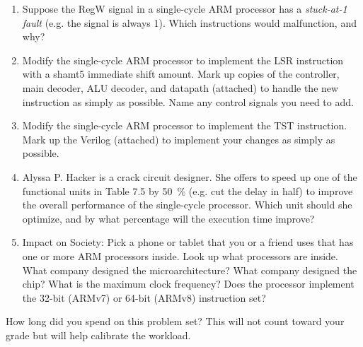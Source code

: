 \documentclass{e85}
\date{2019}
\author{}
\begin{document}
\begin{enumerate}
\item Suppose the RegW signal in a single-cycle ARM processor has a
  \emph{stuck-at-1 fault} (e.g. the signal is always 1).  Which
  instructions would malfunction, and why?

  \begin{solution}
  \end{solution}

\item Modify the single-cycle ARM processor to implement the LSR
  instruction with a shamt5 immediate shift amount.  Mark up copies of
  the controller, main decoder, ALU decoder, and datapath (attached)
  to handle the new instruction as simply as possible.  Name any
  control signals you need to add.

  \begin{solution}
  \end{solution}

\item Modify the single-cycle ARM processor to implement the TST
  instruction.  Mark up the Verilog (attached) to implement your
  changes as simply as possible.

  \begin{solution}
  \end{solution}

\item Alyssa P. Hacker is a crack circuit designer.  She offers to
  speed up one of the functional units in Table 7.5 by
  \SI{50}{\percent} (e.g. cut the delay in half) to improve the
  overall performance of the single-cycle processor.  Which unit
  should she optimize, and by what percentage will the execution time
  improve?

  \begin{solution}
  \end{solution}

\item Impact on Society: Pick a phone or tablet that you or a friend
  uses that has one or more ARM processors inside.  Look up what
  processors are inside.  What company designed the microarchitecture?
  What company designed the chip?  What is the maximum clock
  frequency?  Does the processor implement the 32-bit (ARMv7) or
  64-bit (ARMv8) instruction set?

  \begin{solution}
  \end{solution}
\end{enumerate}

How long did you spend on this problem set?  This will not count
toward your grade but will help calibrate the workload.
\begin{solution}
\end{solution}
\end{document}
